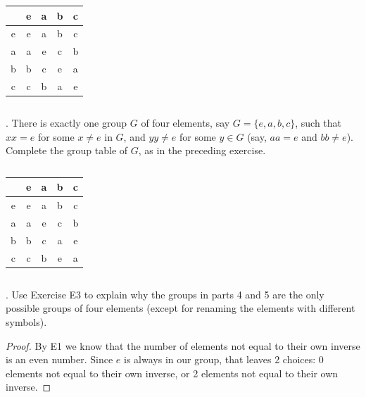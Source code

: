\documentclass[twoside]{amsart}
\begin{document}
\begin{enumerate}[A.]
\begin{enumerate}[(a)]
      \tiny \begin{verbatim}

      \end{verbatim} \normalsize
      \begin{center}
      \begin{tabular}{c|cccc}
           & e & a & b & c \\ \hline
	 e & e & a & b & c \\
	 a & a & e & c & b \\
	 b & b & c & e & a \\
	 c & c & b & a & e
      \end{tabular}
      \end{center}
      \tiny \begin{verbatim}

      \end{verbatim} \normalsize

      . There is exactly one group $G$ of four elements, say
      $G = \{e,a,b,c\}$, such that $xx=e$ for some $x\ne e$ in $G$, and
      $yy \ne e$ for some $y \in G$ (say, $aa=e$ and $bb\ne e$). Complete
      the group table of $G$, as in the preceding exercise.
      \tiny \begin{verbatim}

      \end{verbatim} \normalsize
      \begin{center}
      \begin{tabular}{c|cccc}
           & e & a & b & c \\ \hline
	 e & e & a & b & c \\
	 a & a & e & c & b \\
	 b & b & c & a & e \\
	 c & c & b & e & a
      \end{tabular}
      \end{center}
      \tiny \begin{verbatim}

      \end{verbatim} \normalsize

      . Use Exercise E3 to explain why the groups in parts 4
      and 5 are the only possible groups of four elements (except for
      renaming the elements with different symbols).

      \begin{proof}
      By E1 we know that the number of elements not equal to their
      own inverse is an even number. Since $e$ is always in our group,
      that leaves 2 choices: 0 elements not equal to their own
      inverse, or 2 elements not equal to their own inverse. 
      

\end{proof}
\end{enumerate}
\end{enumerate}
\end{document}
